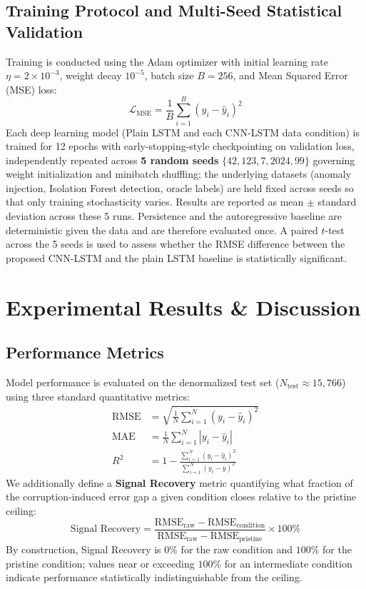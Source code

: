 \documentclass[conference]{IEEEtran}
\begin{document}
\subsection{Training Protocol and Multi-Seed Statistical Validation}
Training is conducted using the Adam optimizer with initial learning rate $\eta = 2\times 10^{-3}$, weight decay $10^{-5}$, batch size $B=256$, and Mean Squared Error (MSE) loss:
\begin{equation}
\mathcal{L}_{\text{MSE}} = \frac{1}{B}\sum_{i=1}^{B}\left(y_i - \hat{y}_i\right)^2
\end{equation}
Each deep learning model (Plain LSTM and each CNN-LSTM data condition) is trained for 12 epochs with early-stopping-style checkpointing on validation loss, independently repeated across \textbf{5 random seeds} $\{42, 123, 7, 2024, 99\}$ governing weight initialization and minibatch shuffling; the underlying datasets (anomaly injection, Isolation Forest detection, oracle labels) are held fixed across seeds so that only training stochasticity varies. Results are reported as mean $\pm$ standard deviation across these 5 runs. Persistence and the autoregressive baseline are deterministic given the data and are therefore evaluated once. A paired $t$-test across the 5 seeds is used to assess whether the RMSE difference between the proposed CNN-LSTM and the plain LSTM baseline is statistically significant.

\section{Experimental Results \& Discussion}

\subsection{Performance Metrics}
Model performance is evaluated on the denormalized test set ($N_{\text{test}} \approx 15{,}766$) using three standard quantitative metrics:
\begin{align}
\text{RMSE} &= \sqrt{\frac{1}{N}\sum_{i=1}^N (y_i - \hat{y}_i)^2} \\
\text{MAE} &= \frac{1}{N}\sum_{i=1}^N |y_i - \hat{y}_i| \\
R^2 &= 1 - \frac{\sum_{i=1}^N (y_i - \hat{y}_i)^2}{\sum_{i=1}^N (y_i - \bar{y})^2}
\end{align}
We additionally define a \textbf{Signal Recovery} metric quantifying what fraction of the corruption-induced error gap a given condition closes relative to the pristine ceiling:
\begin{equation}
\text{Signal Recovery} = \frac{\text{RMSE}_{\text{raw}} - \text{RMSE}_{\text{condition}}}{\text{RMSE}_{\text{raw}} - \text{RMSE}_{\text{pristine}}} \times 100\%
\end{equation}
By construction, Signal Recovery is $0\%$ for the raw condition and $100\%$ for the pristine condition; values near or exceeding $100\%$ for an intermediate condition indicate performance statistically indistinguishable from the ceiling.
\end{document}
